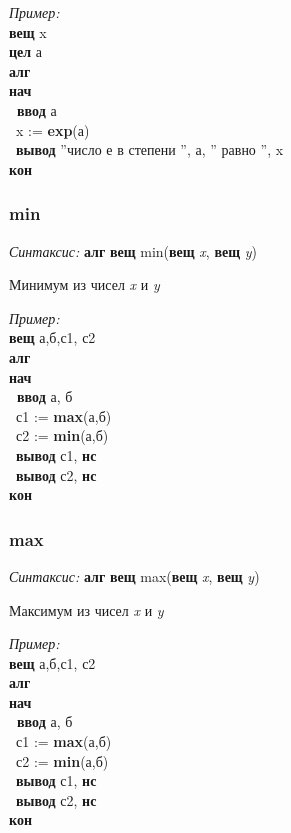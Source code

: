\documentclass[12pt,a4paper]{article}
\newcommand{\otstup}{\textperiodcentered\ }
\begin{document}
\emph{Пример:}  
\sffamily
~\\\textbf{вещ} x
~\\\textbf{цел} а
~\\\textbf{алг
~\\нач
~\\\otstup ввод} а
~\\\otstup x := \textbf{exp}(а)
~\\\otstup \textbf{вывод} ''число е в степени '', а, '' равно '', x
~\\\textbf{кон}

\normalfont
\subsubsection{min}

\emph{Синтаксис:} \textbf{алг} \textbf{вещ} min(\textbf{вещ} \emph{x}, \textbf{вещ} \emph{y})


     
 
       Минимум  из чисел \emph{x} и \emph{y}
      
\emph{Пример:}  
\sffamily
~\\\textbf{вещ} а,б,с1, с2
~\\\textbf{алг
~\\нач
~\\\otstup ввод} а, б
~\\\otstup с1 :=  \textbf{max}(а,б)
~\\\otstup с2 :=  \textbf{min}(а,б)
~\\\otstup \textbf{вывод} с1, \textbf{нс}
~\\\otstup \textbf{вывод} с2, \textbf{нс}
~\\\textbf{кон}

\normalfont
\subsubsection{max}

\emph{Синтаксис:} \textbf{алг} \textbf{вещ} max(\textbf{вещ} \emph{x}, \textbf{вещ} \emph{y})


   
  
       Максимум из чисел \emph{x} и \emph{y}
      
\emph{Пример:}  
\sffamily
~\\\textbf{вещ} а,б,с1, с2
~\\\textbf{алг
~\\нач
~\\\otstup ввод} а, б
~\\\otstup с1 :=  \textbf{max}(а,б)
~\\\otstup с2 :=  \textbf{min}(а,б)
~\\\otstup \textbf{вывод} с1, \textbf{нс}
~\\\otstup \textbf{вывод} с2, \textbf{нс}
~\\\textbf{кон}
\end{document}
